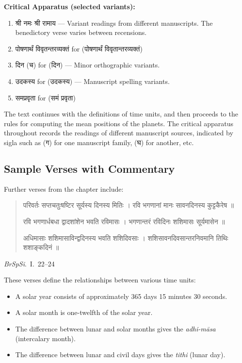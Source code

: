 \documentclass[11pt,a4paper]{article}
\newcommand{\dev}[1]{{\devanagarifont #1}}
\newenvironment{sanskritverse}{%
  \begin{quote}
  \devanagarifont
  \small
  \color{titlecolor}
}{\end{quote}}
\theoremstyle{definition}
\begin{document}
\textbf{Critical Apparatus (selected variants):}

\begin{enumerate}
  \item[1.] \dev{श्री नमः} \textbar{} \dev{श्री रामाय} --- Variant readings from different manuscripts. The benedictory verse varies between recensions.
  
  \item[2.] \dev{पोषणार्थं विवृतन्तरव्यक्तं} for (\dev{पोषणार्थं विवृतान्तरव्यक्तं})
  
  \item[3.] \dev{दिन} (\dev{च}) for (\dev{दिन}) --- Minor orthographic variants.
  
  \item[4.] \dev{उदकस्य} for (\dev{उदकस्य}) --- Manuscript spelling variants.
  
  \item[5.] \dev{समप्रवृता} for (\dev{समं प्रवृता})
\end{enumerate}

\vspace{0.5cm}

The text continues with the definitions of time units, and then proceeds to the rules for computing the mean positions of the planets. The critical apparatus throughout records the readings of different manuscript sources, indicated by sigla such as (\dev{ग}) for one manuscript family, (\dev{घ}) for another, etc.

\subsection{Sample Verses with Commentary}

Further verses from the chapter include:

\begin{sanskritverse}
\dev{परिवर्तः सप्तचतुःषष्टिर सूर्यस्य दिनस्य मितिः ।}
\dev{रवि भगणानां मानः सावनदिनस्य कुट्टकैरेष ॥}

\dev{रवि भगणार्धबधा द्वादशांशेन भवति रविमासः ।}
\dev{भगणान्तरं रविदिनः शशिमासः सूर्यमासेन ॥}

\dev{अधिमासाः शशिमासाविन्द्वदिनस्य भवति शशिदिवसाः ।}
\dev{शशिसावनदिवसान्तरनिवमानि तिथिः शशाङ्कदिनं ॥}
\end{sanskritverse}

\textit{BrSpSi}.\ I.\ 22--24

\vspace{0.5cm}

These verses define the relationships between various time units:
\begin{itemize}
  \item A solar year consists of approximately 365 days 15 minutes 30 seconds.
  \item A solar month is one-twelfth of the solar year.
  \item The difference between lunar and solar months gives the \textit{adhi-m\=asa} (intercalary month).
  \item The difference between lunar and civil days gives the \textit{tithi} (lunar day).
\end{itemize}
\end{document}
